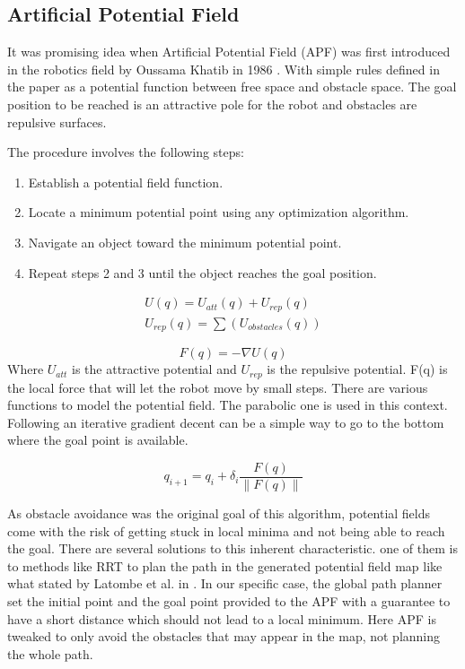 
\subsection{Artificial Potential Field}
It was promising idea when Artificial Potential Field (APF) was first introduced in the robotics field by Oussama Khatib in 1986 \cite{khatib1986real}. With simple rules defined in the paper as a potential function between free space and obstacle space. The goal position to be reached is an attractive pole for the robot and obstacles are repulsive surfaces.


The procedure involves the following steps:
\begin{enumerate}
\item Establish a potential field function.
\item Locate a minimum potential point using any optimization algorithm.
\item Navigate an object toward the minimum potential point.
\item Repeat steps 2 and 3 until the object reaches the goal position.
\end{enumerate}

\begin{equation}
\begin{split}
U(q)=U_{att}(q)+U_{rep}(q) \\
U_{rep}(q)=\sum(U_{obstacles}(q))
\end{split}
\end{equation}

\begin{equation}
F(q)=-\nabla U(q)
\end{equation}
Where
$U_{att}$ is the attractive potential and
$U_{rep}$ is the repulsive potential. F(q) is the local force that will let the robot move by small steps.
There are various functions to model the potential field. The parabolic one is used in this context. 
Following an iterative gradient decent can be a simple way to go to the bottom where the goal point is available. 

\[q_{i+1}=q_{i}+\delta_{i}\frac{F(q)}{\left \| F(q) \right \|}\]



As obstacle avoidance was the original goal of this algorithm, potential fields come with the risk of getting stuck in local minima and not being able to reach the goal. There are several solutions to this inherent characteristic. one of them is to methods like RRT to plan the path in the generated potential field map like what stated by Latombe et al. in \cite{latombe2012robot,planningBook}. In our specific case, the global path planner set the initial point and the goal point provided to the APF with a guarantee to have a short distance which should not lead to a local minimum. Here APF is tweaked to only avoid the obstacles that may appear in the map, not planning the whole path.
